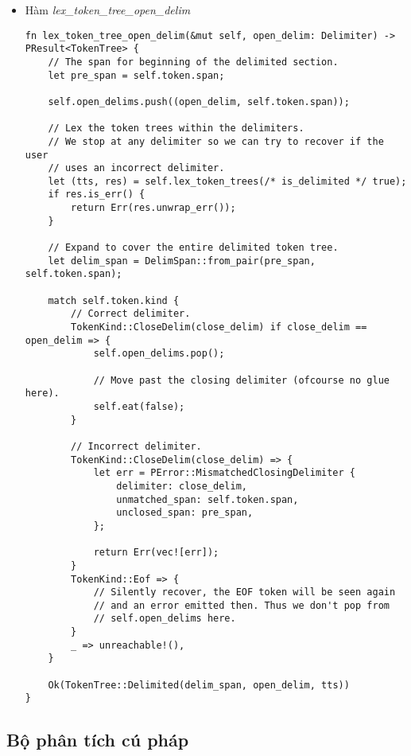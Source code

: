 {\begin{itemize}
    \item \label{ap1:token_tree_lex_token_tree_open_delim}Hàm \textit{lex\_token\_tree\_open\_delim}

\begin{lstlisting}
fn lex_token_tree_open_delim(&mut self, open_delim: Delimiter) -> PResult<TokenTree> {
    // The span for beginning of the delimited section.
    let pre_span = self.token.span;

    self.open_delims.push((open_delim, self.token.span));

    // Lex the token trees within the delimiters.
    // We stop at any delimiter so we can try to recover if the user
    // uses an incorrect delimiter.
    let (tts, res) = self.lex_token_trees(/* is_delimited */ true);
    if res.is_err() {
        return Err(res.unwrap_err());
    }

    // Expand to cover the entire delimited token tree.
    let delim_span = DelimSpan::from_pair(pre_span, self.token.span);

    match self.token.kind {
        // Correct delimiter.
        TokenKind::CloseDelim(close_delim) if close_delim == open_delim => {
            self.open_delims.pop();

            // Move past the closing delimiter (ofcourse no glue here).
            self.eat(false);
        }

        // Incorrect delimiter.
        TokenKind::CloseDelim(close_delim) => {
            let err = PError::MismatchedClosingDelimiter {
                delimiter: close_delim,
                unmatched_span: self.token.span,
                unclosed_span: pre_span,
            };

            return Err(vec![err]);
        }
        TokenKind::Eof => {
            // Silently recover, the EOF token will be seen again
            // and an error emitted then. Thus we don't pop from
            // self.open_delims here.
        }
        _ => unreachable!(),
    }

    Ok(TokenTree::Delimited(delim_span, open_delim, tts))
}    
\end{lstlisting}

\end{itemize}

\subsection{Bộ phân tích cú pháp}
}

